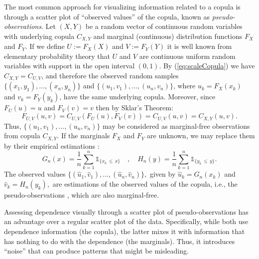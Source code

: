 \documentclass[journal]{vgtc}                %
\begin{document}
The most common approach for visualizing information related to a copula is through a scatter plot of ``observed values'' of the copula, known as \textit{pseudo-observations}. Let $(X,Y)$ be a random vector of continuous random variables with underlying copula $C_{X,Y}$ and marginal (continuous) distribution functions $F_X$ and $F_Y.$ If we define $U:=F_X(X)$ and $V:=F_Y(Y)$ it is well known from elementary probability theory that $U$ and $V$ are continuous uniform random variables with support in the open interval $(0,1)$. By (\ref{eq:scaleCopula}) we have $C_{X,Y}=C_{U,V}$, and therefore the observed random samples $\{(x_1,y_1),\ldots,(x_n,y_n)\}$ and $\{(u_1,v_1),\ldots,(u_n,v_n)\}$, where $u_k=F_X(x_k)$ and $v_k=F_Y(y_k)$, have the same underlying copula. Moreover, since $F_U(u)=u$ and $F_V(v)=v$ then by Sklar's Theorem:
\begin{equation}\label{eq:CopulaObs}
    F_{U,V}(u,v) = C_{U,V}(F_U(u),F_V(v)) = C_{U,V}(u,v) = C_{X,Y}(u,v).
\end{equation}
Thus, $\{(u_1,v_1),\ldots,(u_n,v_n)\}$ may be considered as marginal-free observations from copula $C_{X,Y}.$ If the marginals $F_X$ and $F_Y$ are unknown, we may replace them by their empirical estimations \cite{Wasserman2006}:
\begin{equation}\label{eq_edf}
    G_n(x)=\frac{1}{n}\sum_{k=1}^n\mathbb{1}_{\{x_k\,\leq\,x\}} \quad,\quad H_n(y)=\frac{1}{n}\sum_{k=1}^n\mathbb{1}_{\{y_k\,\leq\, y\}}.
\end{equation}
The observed values $\{(\hat{u}_1,\hat{v}_1),\ldots,(\hat{u}_n,\hat{v}_n)\},$ given by $\hat{u}_k=G_n(x_k)$ and $\hat{v}_k=H_n(y_k),$ are estimations of the observed values of the copula, i.e., the pseudo-observations \cite{Fermanian2013}, which are also marginal-free.

Assessing dependence visually through a scatter plot of pseudo-observations has an advantage over a regular scatter plot of the data. Specifically, while both use dependence information (the copula), the latter mixes it with information that has nothing to do with the dependence (the marginals). Thus, it introduces ``noise'' that can produce patterns that might be misleading. 
\end{document}
